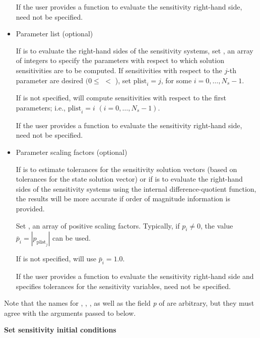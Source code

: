 \begin{Steps}
\begin{itemize}
      If the user provides a function to evaluate the sensitivity right-hand side,
       need not be specified.

    \item Parameter list (optional)

      If {\cvodes} is to evaluate the right-hand sides of the sensitivity 
      systems, set , an array of  integers to specify the 
      parameters  with respect to which solution sensitivities are to be computed.
      If sensitivities with respect to the $j$-th parameter  are desired
      $(0 \leq $  $ < $ ), set
      ${\text{plist}}_i = j$, for some $i = 0,\ldots,N_s-1$.

      If  is not specified, {\cvodes} will compute
      sensitivities with respect to the first  parameters;
      i.e., ${\text{plist}}_i = i$ $(i = 0,\ldots, N_s - 1)$.

      If the user provides a function to evaluate the sensitivity right-hand side,
       need not be specified.

    \item Parameter scaling factors (optional)

      If {\cvodes} is to estimate tolerances for the sensitivity solution vectors (based
      on tolerances for the state solution vector) or if {\cvodes} is to evaluate 
      the right-hand sides of the sensitivity systems using the internal difference-quotient
      function, the results will be more accurate if order of magnitude information is provided.

      Set , an array of  positive scaling factors. Typically,
      if $p_i \ne 0$, the value ${\bar p}_i = |p_{\text{plist}_j}|$ can be used.

      If  is not specified, {\cvodes} will use ${\bar p}_i = 1.0$.

      If the user provides a function to evaluate the sensitivity right-hand side and specifies
      tolerances for the sensitivity variables,  need not be specified.

    \end{itemize}

    Note that the names for , , , as well as the field
    {\em p} of  are arbitrary, but they must agree with the arguments
    passed to  below.

\item
  {\bf Set sensitivity initial conditions}


\end{Steps}
